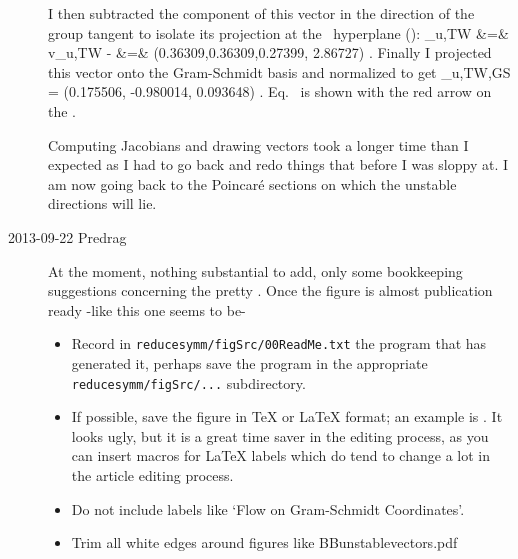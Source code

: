 \begin{description}
	\label{eq:vureqv}
\eea
I then subtracted the component of this vector in the direction of the group tangent
to isolate its projection at the \slice\ hyperplane ():
\bea
	_{u,TW} &=& v_{u,TW} -  
	\continue
		    &=& (0.36309,0.36309,0.27399, 2.86727) .
	\label{eq:vureqvred}
\eea
Finally I projected this vector onto the Gram-Schmidt basis 
and normalized to get
\beq
	_{u,TW,GS} = (0.175506, -0.980014, 0.093648) .
	\label{eq:vureqGS}
\eeq
Eq.~ is shown with the red arrow on the .

Computing Jacobians and drawing vectors took a longer time than I expected
as I had to go back and redo things that before I was sloppy at. I am now
going back to the Poincar\'e sections on which the unstable directions will lie.

\item[2013-09-22 Predrag]
At the moment, nothing substantial to add, only some bookkeeping
suggestions concerning the pretty . Once
the figure is almost publication ready -like this one seems to be-
\begin{itemize}
  \item Record in \texttt{reducesymm/figSrc/00ReadMe.txt} the program
that has generated it, perhaps save the program in the appropriate
\texttt{reducesymm/figSrc/...} subdirectory.
  \item If possible, save the figure in TeX or LaTeX format; an example
is . It looks ugly, but it is a great time
saver in the editing process, as you can insert macros for LaTeX
labels which do tend to change a lot in the article editing process.
  \item Do not include labels like `Flow on Gram-Schmidt Coordinates'.
  \item Trim all white edges around figures like BBunstablevectors.pdf
\end{itemize}



\end{description}
